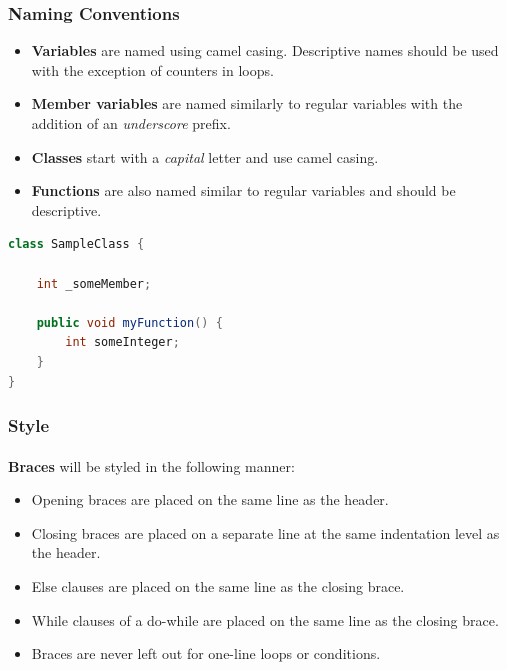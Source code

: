 \documentclass{article}
\begin{document}
    \subsubsection{Naming Conventions}
    \label{sec:java-nc}

    \begin{itemize}
        \item \textbf{Variables} are named using camel casing. Descriptive names
                should be used with the exception of counters in loops.
        \item \textbf{Member variables} are named similarly to regular variables
                with the addition of an \textit{underscore} prefix.
        \item \textbf{Classes} start with a \textit{capital} letter and use
                camel casing.
        \item \textbf{Functions} are also named similar to regular variables and
                should be descriptive.
    \end{itemize}

    \begin{lstlisting}[language=java]
class SampleClass {

    int _someMember;

    public void myFunction() {
        int someInteger;
    }
}
    \end{lstlisting}

    \subsubsection{Style}
    \label{sec:java-st}

    \paragraph{}
    \textbf{Braces} will be styled in the following manner:
    \begin{itemize}
        \item Opening braces are placed on the same line as the header.
        \item Closing braces are placed on a separate line at the same
                indentation level as the header.
        \item Else clauses are placed on the same line as the closing brace.
        \item While clauses of a do-while are placed on the same line as the
                closing brace.
        \item Braces are never left out for one-line loops or conditions.
    \end{itemize}
\end{document}
